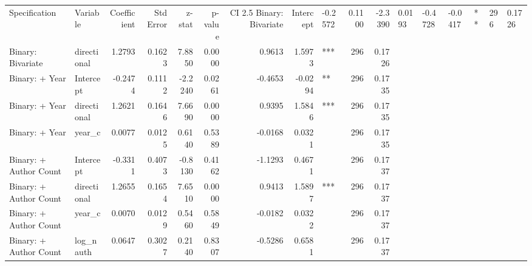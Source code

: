 \begin{tabular}{llrrrrrrlrr}
\toprule
Specification & Variable & Coefficient & Std Error & z-stat & p-value & CI 2.5%
\midrule
Binary: Bivariate & Intercept & -0.2572 & 0.1100 & -2.3390 & 0.0193 & -0.4728 & -0.0417 & ** & 296 & 0.1726 \\
Binary: Bivariate & directional & 1.2793 & 0.1623 & 7.8850 & 0.0000 & 0.9613 & 1.5973 & *** & 296 & 0.1726 \\
Binary: + Year & Intercept & -0.2474 & 0.1112 & -2.2240 & 0.0261 & -0.4653 & -0.0294 & ** & 296 & 0.1735 \\
Binary: + Year & directional & 1.2621 & 0.1646 & 7.6690 & 0.0000 & 0.9395 & 1.5846 & *** & 296 & 0.1735 \\
Binary: + Year & year_c & 0.0077 & 0.0125 & 0.6140 & 0.5389 & -0.0168 & 0.0321 &  & 296 & 0.1735 \\
Binary: + Author Count & Intercept & -0.3311 & 0.4073 & -0.8130 & 0.4162 & -1.1293 & 0.4671 &  & 296 & 0.1737 \\
Binary: + Author Count & directional & 1.2655 & 0.1654 & 7.6510 & 0.0000 & 0.9413 & 1.5897 & *** & 296 & 0.1737 \\
Binary: + Author Count & year_c & 0.0070 & 0.0129 & 0.5460 & 0.5849 & -0.0182 & 0.0322 &  & 296 & 0.1737 \\
Binary: + Author Count & log_nauth & 0.0647 & 0.3027 & 0.2140 & 0.8307 & -0.5286 & 0.6581 &  & 296 & 0.1737 \\
\bottomrule
\end{tabular}
